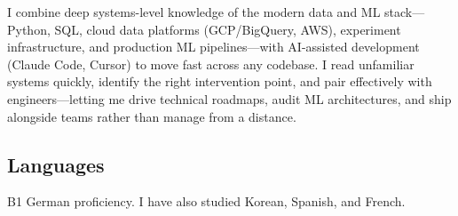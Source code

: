 \documentclass[a4paper]{article}
\begin{document}
I combine deep systems-level knowledge of the modern data and ML stack---Python, SQL, cloud data platforms (GCP/BigQuery, AWS), experiment infrastructure, and production ML pipelines---with AI-assisted development (Claude Code, Cursor) to move fast across any codebase. I read unfamiliar systems quickly, identify the right intervention point, and pair effectively with engineers---letting me drive technical roadmaps, audit ML architectures, and ship alongside teams rather than manage from a distance.

\subsection*{Languages}

B1 German proficiency. I have also studied Korean, Spanish, and French.
\end{document}
